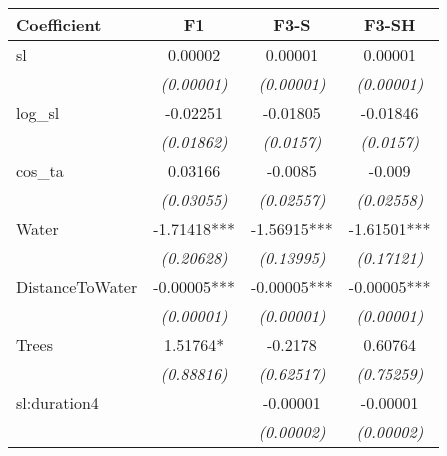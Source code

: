 
\begin{tabular}[t]{lccc}
\toprule
Coefficient & F1 & F3-S & F3-SH\\
\midrule
sl & 0.00002 & 0.00001 & 0.00001\\
\begingroup\fontsize{8}{10}\selectfont \em{}\endgroup & \begingroup\fontsize{8}{10}\selectfont \em{(0.00001)}\endgroup & \begingroup\fontsize{8}{10}\selectfont \em{(0.00001)}\endgroup & \begingroup\fontsize{8}{10}\selectfont \em{\vphantom{1} (0.00001)}\endgroup\\
log\_sl & -0.02251 & -0.01805 & -0.01846\\
\begingroup\fontsize{8}{10}\selectfont \em{}\endgroup & \begingroup\fontsize{8}{10}\selectfont \em{(0.01862)}\endgroup & \begingroup\fontsize{8}{10}\selectfont \em{(0.0157)}\endgroup & \begingroup\fontsize{8}{10}\selectfont \em{(0.0157)}\endgroup\\
cos\_ta & 0.03166 & -0.0085 & -0.009\\
\begingroup\fontsize{8}{10}\selectfont \em{}\endgroup & \begingroup\fontsize{8}{10}\selectfont \em{(0.03055)}\endgroup & \begingroup\fontsize{8}{10}\selectfont \em{(0.02557)}\endgroup & \begingroup\fontsize{8}{10}\selectfont \em{(0.02558)}\endgroup\\
Water & -1.71418*** & -1.56915*** & -1.61501***\\
\begingroup\fontsize{8}{10}\selectfont \em{}\endgroup & \begingroup\fontsize{8}{10}\selectfont \em{(0.20628)}\endgroup & \begingroup\fontsize{8}{10}\selectfont \em{(0.13995)}\endgroup & \begingroup\fontsize{8}{10}\selectfont \em{(0.17121)}\endgroup\\
DistanceToWater & -0.00005*** & -0.00005*** & -0.00005***\\
\begingroup\fontsize{8}{10}\selectfont \em{}\endgroup & \begingroup\fontsize{8}{10}\selectfont \em{(0.00001)}\endgroup & \begingroup\fontsize{8}{10}\selectfont \em{(0.00001)}\endgroup & \begingroup\fontsize{8}{10}\selectfont \em{(0.00001)}\endgroup\\
Trees & 1.51764* & -0.2178 & 0.60764\\
\begingroup\fontsize{8}{10}\selectfont \em{}\endgroup & \begingroup\fontsize{8}{10}\selectfont \em{(0.88816)}\endgroup & \begingroup\fontsize{8}{10}\selectfont \em{(0.62517)}\endgroup & \begingroup\fontsize{8}{10}\selectfont \em{(0.75259)}\endgroup\\
sl:duration4 &  & -0.00001 & -0.00001\\
\begingroup\fontsize{8}{10}\selectfont \em{}\endgroup & \begingroup\fontsize{8}{10}\selectfont \em{}\endgroup & \begingroup\fontsize{8}{10}\selectfont \em{(0.00002)}\endgroup & \begingroup\fontsize{8}{10}\selectfont \em{\vphantom{1} (0.00002)}\endgroup\\

\end{tabular}
